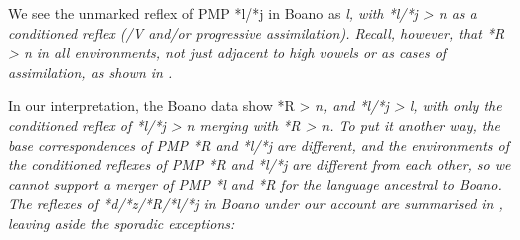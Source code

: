 
We see the unmarked reflex of PMP *l/*j in Boano as \it{l},
with *l/*j > \it{n} as a conditioned reflex
(/V\tsc{\tsc{[+high]}} and/or progressive assimilation).
Recall, however, that *R > \it{n} in all environments,
not just adjacent to high vowels or as cases of assimilation,
as shown in .

In our interpretation, the Boano data show *R > \it{n},
and *l/*j > \it{l},
with only the conditioned reflex of *l/*j > \it{n} merging with *R > \it{n}.
To put it another way,
the base correspondences of PMP *R
and *l/*j are different,
and the environments of the conditioned reflexes of PMP *R
and *l/*j are different from each other,
so we cannot support a merger of PMP *l
and *R for the language ancestral to Boano.
The reflexes of *d/*z/*R/*l/*j in Boano under our account are
summarised in , leaving aside the sporadic exceptions:


